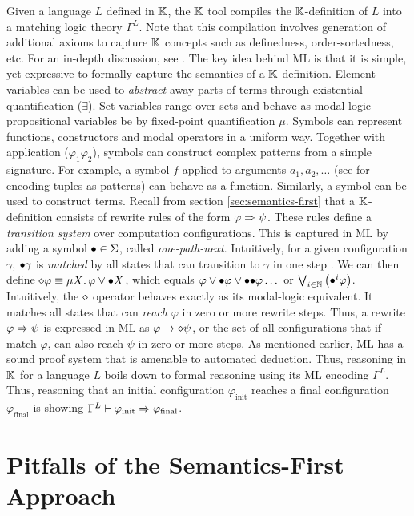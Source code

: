 Given a language $L$ defined in $\mathbb{K}$, the $\mathbb{K}$ tool compiles
the $\mathbb{K}$-definition of $L$ into a matching logic theory $\Gamma^L$.
Note that this compilation involves generation of additional axioms
to capture $\mathbb{K}{}$ concepts such as definedness, order-sortedness, etc.
For an in-depth discussion, see \cite{ChenTR19}.
The key idea behind ML is that it is simple, yet expressive to
formally capture the semantics of a $\mathbb{K}$ definition.
Element variables can be used to \emph{abstract} away parts of terms through
existential quantification ($\exists$).
Set variables range over sets and behave as modal logic propositional variables be
by fixed-point quantification $\mu$. Symbols can represent functions,
constructors and modal operators in a uniform way. Together with
application ($\varphi_1 \varphi_2$), symbols can construct complex patterns
from a simple signature. For example, a symbol $f$ applied to
arguments $a_1,a_2,\dots$ (see \cite{ChenLICS19} for encoding tuples as
patterns) can behave as a function. Similarly, a symbol 
can be used to construct  terms.
Recall from section \ref{sec:semantics-first} that a $\mathbb{K}$-definition
consists of rewrite rules of the form $\varphi \Rightarrow \psi$. These rules
 define a \emph{transition system} over computation configurations.
This is captured in ML by adding a symbol ${\bullet} \in \Sigma$, called
\emph{one-path-next}. Intuitively, for a given configuration $\gamma$, ${\bullet}\gamma$
is \emph{matched} by all states that can transition to $\gamma$ in one step \cite{ChenTR20}.
We can then define $\diamond \varphi \equiv \mu X \mathord{.\,} \varphi \lor {\bullet} X$,
  which equals $\varphi \vee {\bullet}\varphi \vee {\bullet}{\bullet}\varphi \dots$ or $\bigvee_{i \in
  \mathbb{N}}\left({\bullet}^{i}\varphi\right)$.
Intuitively, the $\diamond$ operator behaves exactly
as its modal-logic equivalent. It matches all states that can \emph{reach} $\varphi$ in zero or more rewrite steps.
Thus, a rewrite $\varphi \Rightarrow \psi$ is expressed in ML as $\varphi \to \diamond \psi$, or
the set of all configurations that if match $\varphi$, can also reach $\psi$ in zero or more steps.
As mentioned earlier, ML has a sound proof system that is amenable to automated
deduction. Thus, reasoning in $\mathbb{K}$ for a language $L$ boils down to formal
reasoning using its ML encoding $\Gamma^{L}$. Thus, reasoning that
an initial configuration $\varphi_{\text{init}}$ reaches a final configuration
$\varphi_{\text{final}}$ is showing $\Gamma^{L} \vdash \varphi_{\text{init}} \Rightarrow
\varphi_{\text{final}}$.

\section{Pitfalls of the Semantics-First Approach}\label{sec:semantics-first-pitfalls}

